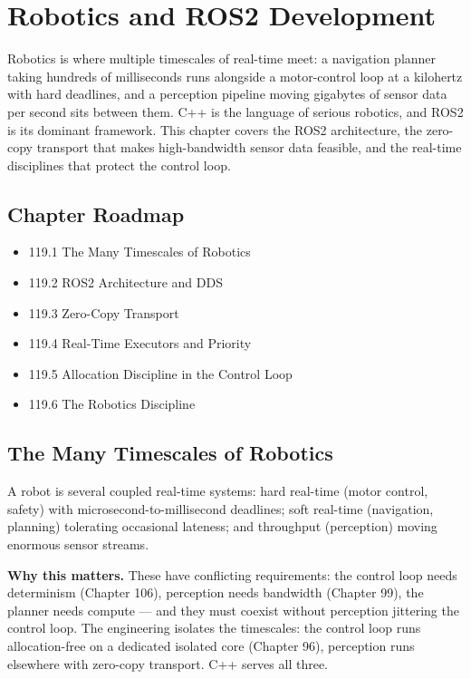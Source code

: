 \chapter{Robotics and ROS2 Development}

Robotics is where multiple timescales of real-time meet: a navigation planner taking hundreds of milliseconds runs alongside a motor-control loop at a kilohertz with hard deadlines, and a perception pipeline moving gigabytes of sensor data per second sits between them. C++ is the language of serious robotics, and ROS2 is its dominant framework. This chapter covers the ROS2 architecture, the zero-copy transport that makes high-bandwidth sensor data feasible, and the real-time disciplines that protect the control loop.

\section*{Chapter Roadmap}
\begin{itemize}
\item 119.1 The Many Timescales of Robotics
\item 119.2 ROS2 Architecture and DDS
\item 119.3 Zero-Copy Transport
\item 119.4 Real-Time Executors and Priority
\item 119.5 Allocation Discipline in the Control Loop
\item 119.6 The Robotics Discipline
\end{itemize}

\section{The Many Timescales of Robotics}
A robot is several coupled real-time systems: hard real-time (motor control, safety) with microsecond-to-millisecond deadlines; soft real-time (navigation, planning) tolerating occasional lateness; and throughput (perception) moving enormous sensor streams.

\textbf{Why this matters.} These have conflicting requirements: the control loop needs determinism (Chapter 106), perception needs bandwidth (Chapter 99), the planner needs compute --- and they must coexist without perception jittering the control loop. The engineering isolates the timescales: the control loop runs allocation-free on a dedicated isolated core (Chapter 96), perception runs elsewhere with zero-copy transport. C++ serves all three.

